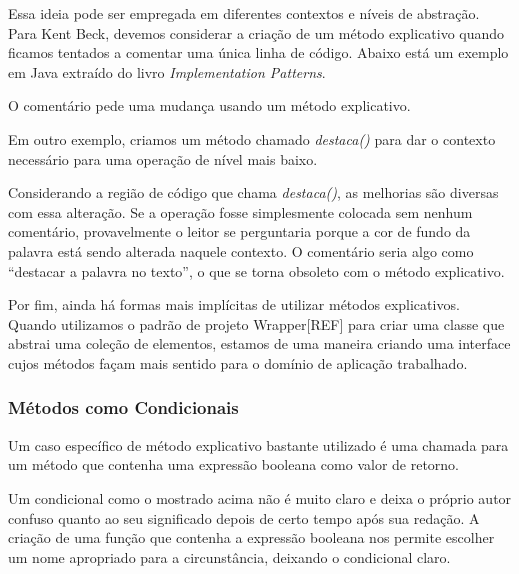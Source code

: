Essa ideia pode ser empregada em diferentes contextos e níveis de abstração. Para Kent Beck, devemos considerar a criação de um método explicativo quando ficamos tentados a comentar uma única linha de código. Abaixo está um exemplo em Java extraído do livro \textit{Implementation Patterns}.



O comentário pede uma mudança usando um método explicativo.
	


Em outro exemplo, criamos um método chamado \textit{destaca()} para dar o contexto necessário para uma operação de nível mais baixo. 



Considerando a região de código que chama \textit{destaca()}, as melhorias são diversas com essa alteração. Se a operação fosse simplesmente colocada sem nenhum comentário, provavelmente o leitor se perguntaria porque a cor de fundo da palavra está sendo alterada naquele contexto. O comentário seria algo como “destacar a palavra no texto”, o que se torna obsoleto com o método explicativo. 

Por fim, ainda há formas mais implícitas de utilizar métodos explicativos. Quando utilizamos o padrão de projeto Wrapper[REF] para criar uma classe que abstrai uma coleção de elementos, estamos de uma maneira criando uma interface cujos métodos façam mais sentido para o domínio de aplicação trabalhado.

\subsubsection{Métodos como Condicionais}
\label{metodos:condicionais}
Um caso específico de método explicativo bastante utilizado é uma chamada para um método que contenha uma expressão booleana como valor de retorno.
	


Um condicional como o mostrado acima não é muito claro e deixa o próprio autor confuso quanto ao seu significado depois de certo tempo após sua redação. A criação de uma função que contenha a expressão booleana nos permite escolher um nome apropriado para a circunstância, deixando o condicional claro.


